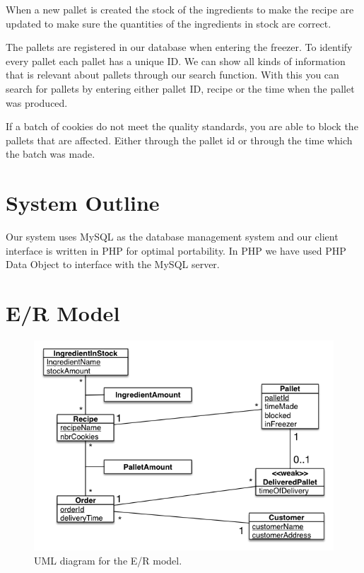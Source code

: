 \documentclass[a4paper]{article}
\begin{document}
When a new pallet is created the stock of the ingredients to make the recipe are updated to make sure the quantities of the ingredients in stock are correct.

The pallets are registered in our database when entering the freezer. To identify every pallet each pallet has a unique ID.
We can show all kinds of information that is relevant about pallets through our search function. With this you can search for pallets by entering either pallet ID, recipe or the time when the pallet was produced.

If a batch of cookies do not meet the quality standards, you are able to block the pallets that are affected. Either through the pallet id or through the time which the batch was made. 




\section{System Outline}
Our system uses MySQL as the database management system and our client interface is written in PHP for optimal portability. In PHP we have used PHP Data Object to interface with the MySQL server.


\begin{description}
\item{}
\end{description}
\section{E/R Model}
\begin{figure}[!h]
\centering
\includegraphics[scale=0.7]{projectUMLFinal.png}
\caption{UML diagram for the E/R model.}
\label{uml}
\end{figure}
\end{document}
